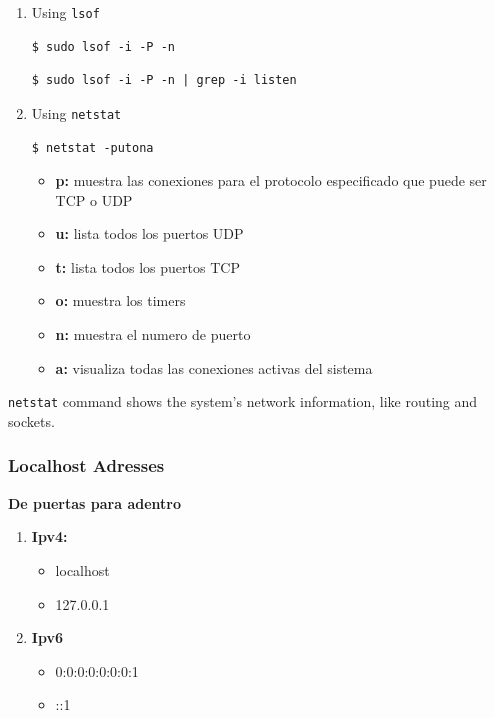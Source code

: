 \documentclass{article}
\newenvironment{blocktemplate}[1]{%
    \tcolorbox[beamer,%
    noparskip,breakable,
    colframe=Blue,%
    colbacklower=LimeGreen!75!LightGreen,%
    title=#1]}%
    {\endtcolorbox}
\newenvironment{codetemplate}[1][]{%
  \mybasecolorbox[#1]
  \itshape
}{%
  \endmybasecolorbox
}
\begin{document}
\begin{enumerate}
    \item Using \verb|lsof|
\begin{codetemplate}{}
\begin{verbatim}
$ sudo lsof -i -P -n
\end{verbatim}
\end{codetemplate}
\begin{codetemplate}{}
\begin{verbatim}
$ sudo lsof -i -P -n | grep -i listen
\end{verbatim}
\end{codetemplate}

    \item Using \verb|netstat|
\begin{codetemplate}{}
\begin{verbatim}
$ netstat -putona
\end{verbatim}
\end{codetemplate}

\begin{itemize}
    \item \textbf{p:} muestra las conexiones para el protocolo especificado que puede ser TCP o UDP
    \item \textbf{u:} lista todos los puertos UDP
    \item \textbf{t:} lista todos los puertos TCP
    \item \textbf{o:} muestra los timers
    \item \textbf{n:} muestra el numero de puerto
    \item \textbf{a:} visualiza todas las conexiones activas del sistema
\end{itemize}
\end{enumerate}

\begin{blocktemplate}{NOTE}
\verb|netstat| command shows the system’s network information, like routing and sockets.
\end{blocktemplate}

\subsubsection{Localhost Adresses}
\textbf{De puertas para adentro}
\begin{enumerate}
    \item \textbf{Ipv4:}
    \begin{itemize}
        \item localhost
        \item 127.0.0.1
    \end{itemize}
    \item \textbf{Ipv6}
    \begin{itemize}
        \item 0:0:0:0:0:0:0:1
        \item ::1
    \end{itemize}
\end{enumerate}
\end{document}
